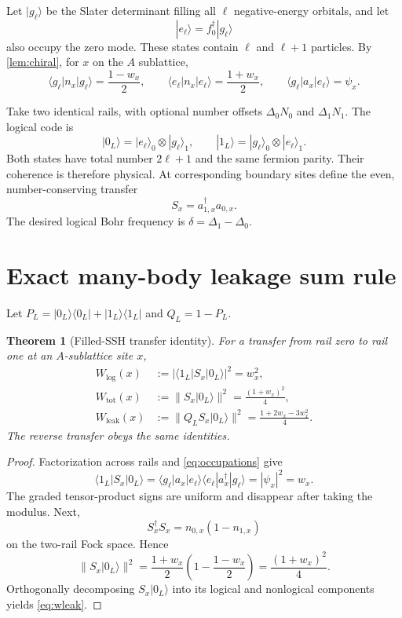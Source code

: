 \documentclass[11pt,a4paper]{article}
\newtheorem{theorem}{Theorem}[section]
\theoremstyle{remark}
\begin{document}
Let $|g_\ell\rangle$ be the Slater determinant filling all $\ell$ negative-energy orbitals, and let
\[
 |e_\ell\rangle=f_0^\dagger|g_\ell\rangle
\]
also occupy the zero mode.  These states contain $\ell$ and $\ell+1$ particles.  By \cref{lem:chiral}, for $x$ on the $A$ sublattice,
\begin{equation}\label{eq:occupations}
 \langle g_\ell|n_x|g_\ell\rangle=\frac{1-w_x}{2},
 \qquad
 \langle e_\ell|n_x|e_\ell\rangle=\frac{1+w_x}{2},
 \qquad
 \langle g_\ell|a_x|e_\ell\rangle=\psi_x.
\end{equation}

Take two identical rails, with optional number offsets $\Delta_0N_0$ and $\Delta_1N_1$.  The logical code is
\[
 |0_L\rangle=|e_\ell\rangle_0\otimes|g_\ell\rangle_1,
 \qquad
 |1_L\rangle=|g_\ell\rangle_0\otimes|e_\ell\rangle_1.
\]
Both states have total number $2\ell+1$ and the same fermion parity.  Their coherence is therefore physical.  At corresponding boundary sites define the even, number-conserving transfer
\[
 S_x=a_{1,x}^\dagger a_{0,x}.
\]
The desired logical Bohr frequency is $\delta=\Delta_1-\Delta_0$.

\section{Exact many-body leakage sum rule}

Let $P_L=|0_L\rangle\langle0_L|+|1_L\rangle\langle1_L|$ and $Q_L=1-P_L$.

\begin{theorem}[Filled-SSH transfer identity]\label{thm:filledidentity}
For a transfer from rail zero to rail one at an $A$-sublattice site $x$,
\begin{align}
 W_{\log}(x)
 &:=|\langle1_L|S_x|0_L\rangle|^2=w_x^2,\label{eq:wlog}\\
 W_{\mathrm{tot}}(x)
 &:=\|S_x|0_L\rangle\|^2=\frac{(1+w_x)^2}{4},\label{eq:wtot}\\
 W_{\mathrm{leak}}(x)
 &:=\|Q_LS_x|0_L\rangle\|^2
 =\frac{1+2w_x-3w_x^2}{4}.\label{eq:wleak}
\end{align}
The reverse transfer obeys the same identities.
\end{theorem}

\begin{proof}
Factorization across rails and \cref{eq:occupations} give
\[
 \langle1_L|S_x|0_L\rangle
 =\langle g_\ell|a_x|e_\ell\rangle
  \langle e_\ell|a_x^\dagger|g_\ell\rangle
 =|\psi_x|^2=w_x.
\]
The graded tensor-product signs are uniform and disappear after taking the modulus.  Next,
\[
 S_x^\dagger S_x=n_{0,x}(1-n_{1,x})
\]
on the two-rail Fock space.  Hence
\[
 \|S_x|0_L\rangle\|^2
 =\frac{1+w_x}{2}\left(1-\frac{1-w_x}{2}\right)
 =\frac{(1+w_x)^2}{4}.
\]
Orthogonally decomposing $S_x|0_L\rangle$ into its logical and nonlogical components yields \cref{eq:wleak}.
\end{proof}
\end{document}
